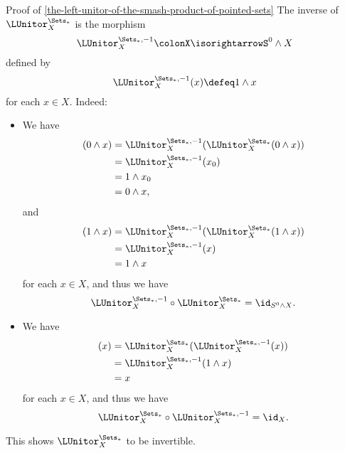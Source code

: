 \begin{Proof}{Proof of \cref{the-left-unitor-of-the-smash-product-of-pointed-sets}}
    The inverse of $\LUnitor^{\Sets_{*}}_{X}$ is the morphism
    \[
        \LUnitor^{\Sets_{*},-1}_{X}%
        \colon%
        X%
        \isorightarrow%
        S^{0}\wedge X%
    \]%
    defined by
    \[
        \LUnitor^{\Sets_{*},-1}_{X}(x)%
        \defeq%
        1\wedge x
    \]%
    for each $x\in X$. Indeed:
    \begin{itemize}
        \item{}We have
            \begin{align*}
                [\LUnitor^{\Sets_{*},-1}_{X}\circ\LUnitor^{\Sets_{*}}_{X}](0\wedge x) &= \LUnitor^{\Sets_{*},-1}_{X}(\LUnitor^{\Sets_{*}}_{X}(0\wedge x))\\
                                                                                      &= \LUnitor^{\Sets_{*},-1}_{X}(x_{0})\\
                                                                                      &= 1\wedge x_{0}\\
                                                                                      &= 0\wedge x,
            \end{align*}
            and 
            \begin{align*}
                [\LUnitor^{\Sets_{*},-1}_{X}\circ\LUnitor^{\Sets_{*}}_{X}](1\wedge x) &= \LUnitor^{\Sets_{*},-1}_{X}(\LUnitor^{\Sets_{*}}_{X}(1\wedge x))\\
                                                                                      &= \LUnitor^{\Sets_{*},-1}_{X}(x)\\
                                                                                      &= 1\wedge x
            \end{align*}
            for each $x\in X$, and thus we have
            \[
                \LUnitor^{\Sets_{*},-1}_{X}%
                \circ%
                \LUnitor^{\Sets_{*}}_{X}%
                =%
                \id_{S^{0}\wedge X}.%
            \]%
        \item{}We have
            \begin{align*}
                [\LUnitor^{\Sets_{*}}_{X}\circ\LUnitor^{\Sets_{*},-1}_{X}](x) &= \LUnitor^{\Sets_{*}}_{X}(\LUnitor^{\Sets_{*},-1}_{X}(x))\\
                                                                              &= \LUnitor^{\Sets_{*},-1}_{X}(1\wedge x)\\
                                                                              &= x
            \end{align*}
            for each $x\in X$, and thus we have
            \[
                \LUnitor^{\Sets_{*}}_{X}%
                \circ%
                \LUnitor^{\Sets_{*},-1}_{X}%
                =%
                \id_{X}.%
            \]%
    \end{itemize}
    This shows $\LUnitor^{\Sets_{*}}_{X}$ to be invertible.


\end{Proof}
